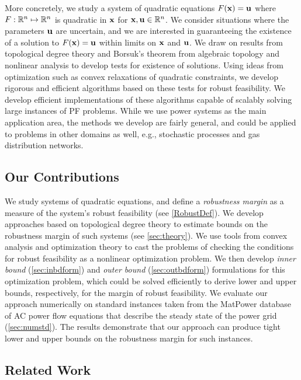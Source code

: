 \medskip
More concretely, we study a system of quadratic equations $F(\mathbf{x})=\mathbf{u}$ where $F: \mathbb{R}^n \mapsto \mathbb{R}^n$ is quadratic in $\mathbf{x}$ for $\mathbf{x},\mathbf{u} \in \mathbb{R}^n$.
  We consider situations where the parameters $\mathbf{u}$ are uncertain, and we are interested in guaranteeing the existence of a solution to $F(\mathbf{x}) = \mathbf{u}$ within limits on $\mathbf{x}$ and $\mathbf{u}$.
We draw on results from topological degree theory and Borsuk's theorem from algebraic topology and nonlinear analysis to develop tests for existence of solutions.
Using ideas from optimization such as convex relaxations of quadratic constraints, we develop rigorous and efficient algorithms based on these tests for robust feasibility.
We develop efficient implementations of these algorithms capable of scalably solving large instances of PF problems.
While we use power systems as the main application area, the methods we develop are fairly general, and could be applied to problems in other domains as well, e.g., stochastic processes and gas distribution networks.

\subsection{Our Contributions}
  We study systems of quadratic equations, and define a \emph{robustness margin} as a measure of the system's robust feasibility (see \cref{RobustDef}).
  We develop approaches based on topological degree theory to estimate bounds on the robustness margin of such systems (see \cref{sec:theory}).
  We use tools from convex analysis and optimization theory to cast the problems of checking the conditions for robust feasibility as a nonlinear optimization problem.
  We then develop \emph{inner bound} (\cref{sec:inbdform}) and \emph{outer bound} (\cref{sec:outbdform}) formulations for this optimization problem, which could be solved efficiently to derive lower and upper bounds, respectively, for the margin of robust feasibility.
  We evaluate our approach numerically on standard instances taken from the MatPower database of AC power flow equations that describe the steady state of the power grid (\cref{sec:numstd}).
  The results demonstrate that our approach can produce tight lower and upper bounds on the robustness margin for such instances.

\subsection{Related Work}

  
